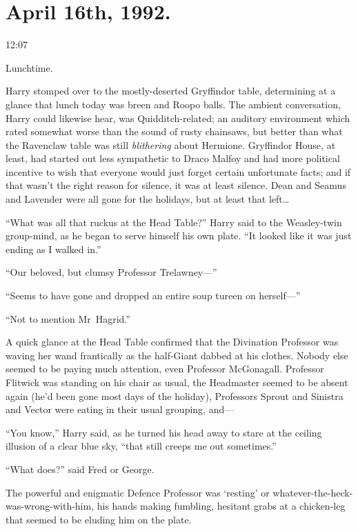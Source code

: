 
\section{April 16th, 1992.}

12:07\pm

Lunchtime.

Harry stomped over to the mostly-deserted Gryffindor table, determining at a glance that lunch today was breen and Roopo balls. The ambient conversation, Harry could likewise hear, was Quidditch-related; an auditory environment which rated somewhat worse than the sound of rusty chainsaws, but better than what the Ravenclaw table was still \emph{blithering} about Hermione. Gryffindor House, at least, had started out less sympathetic to Draco Malfoy and had more political incentive to wish that everyone would just forget certain unfortunate facts; and if that wasn’t the right reason for silence, it was at least silence. Dean and Seamus and Lavender were all gone for the holidays, but at least that left…

“What was all that ruckus at the Head Table?” Harry said to the Weasley-twin group-mind, as he began to serve himself his own plate. “It looked like it was just ending as I walked in.”

“Our beloved, but clumsy Professor Trelawney—”

“Seems to have gone and dropped an entire soup tureen on herself—”

“Not to mention Mr~Hagrid.”

A quick glance at the Head Table confirmed that the Divination Professor was waving her wand frantically as the half-Giant dabbed at his clothes. Nobody else seemed to be paying much attention, even Professor McGonagall. Professor Flitwick was standing on his chair as usual, the Headmaster seemed to be absent again (he’d been gone most days of the holiday), Professors Sprout and Sinistra and Vector were eating in their usual grouping, and—

“You know,” Harry said, as he turned his head away to stare at the ceiling illusion of a clear blue sky, “that still creeps me out sometimes.”

“What does?” said Fred or George.

The powerful and enigmatic Defence Professor was ‘resting’ or whatever-the-heck-was-wrong-with-him, his hands making fumbling, hesitant grabs at a chicken-leg that seemed to be eluding him on the plate.

